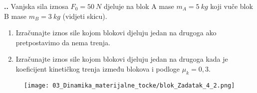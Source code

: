 
\noindent 
\textbf{
\thecjelina.\thezadatak.}
Vanjska sila iznosa $F_0=50\ N$ djeluje na blok A mase $m_A= 5\ kg$ koji vuče blok B mase $m_B= 3\ kg$ (vidjeti skicu). 
\begin{enumerate}[label=\alph*)]
 \item Izračunajte iznos sile kojom blokovi djeluju jedan na drugoga ako pretpostavimo da nema trenja.
 \item Izračunajte iznos sile kojom blokovi djeluju jedan na drugoga kada je koeficijent kinetičkog trenja između blokova i podloge $\mu_k =0,3$.
\end{enumerate}


\begin{figure}[h]%
  \begin{center}
    \texttt{[image: 03\_Dinamika\_materijalne\_tocke/blok\_Zadatak\_4\_2.png]}
  \end{center}
\end{figure}

